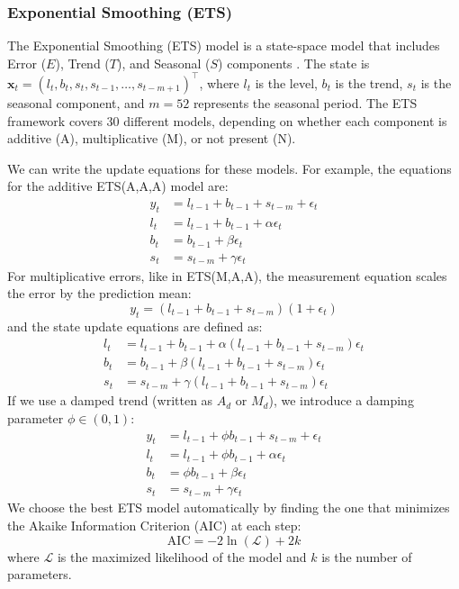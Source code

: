 \subsubsection{Exponential Smoothing (ETS)}
The Exponential Smoothing (ETS) model is a state-space model that includes Error ($E$), Trend ($T$), and Seasonal ($S$) components \cite{hyndman2008forecasting}. The state is $\mathbf{x}_t = (l_t, b_t, s_t, s_{t-1}, \dots, s_{t-m+1})^\top$, where $l_t$ is the level, $b_t$ is the trend, $s_t$ is the seasonal component, and $m = 52$ represents the seasonal period. The ETS framework covers 30 different models, depending on whether each component is additive (A), multiplicative (M), or not present (N).

We can write the update equations for these models. For example, the equations for the additive ETS(A,A,A) model are:
\begin{align}
y_t &= l_{t-1} + b_{t-1} + s_{t-m} + \epsilon_t \\
l_t &= l_{t-1} + b_{t-1} + \alpha \epsilon_t \\
b_t &= b_{t-1} + \beta \epsilon_t \\
s_t &= s_{t-m} + \gamma \epsilon_t
\end{align}
For multiplicative errors, like in ETS(M,A,A), the measurement equation scales the error by the prediction mean:
\begin{equation}
y_t = (l_{t-1} + b_{t-1} + s_{t-m})(1 + \epsilon_t)
\end{equation}
and the state update equations are defined as:
\begin{align}
l_t &= l_{t-1} + b_{t-1} + \alpha (l_{t-1} + b_{t-1} + s_{t-m}) \epsilon_t \\
b_t &= b_{t-1} + \beta (l_{t-1} + b_{t-1} + s_{t-m}) \epsilon_t \\
s_t &= s_{t-m} + \gamma (l_{t-1} + b_{t-1} + s_{t-m}) \epsilon_t
\end{align}
If we use a damped trend (written as $A_d$ or $M_d$), we introduce a damping parameter $\phi \in (0, 1)$:
\begin{align}
y_t &= l_{t-1} + \phi b_{t-1} + s_{t-m} + \epsilon_t \\
l_t &= l_{t-1} + \phi b_{t-1} + \alpha \epsilon_t \\
b_t &= \phi b_{t-1} + \beta \epsilon_t \\
s_t &= s_{t-m} + \gamma \epsilon_t
\end{align}
We choose the best ETS model automatically by finding the one that minimizes the Akaike Information Criterion (AIC) at each step:
\begin{equation}
\text{AIC} = -2\ln(\mathcal{L}) + 2k
\end{equation}
where $\mathcal{L}$ is the maximized likelihood of the model and $k$ is the number of parameters.

